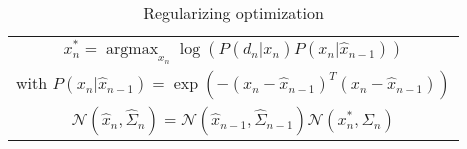 \begin{table}[!h] 
\centering
\caption{Regularizing optimization\label{tab:regularizing}} 
\begin{tabular}{|c|}
\hline

$x_n^* = \operatorname{argmax}_{x_n} \log \left( P(d_n|x_n) P(x_n |\hat{x}_{n - 1})\right)$ \\

with $P(x_n |\hat{x}_{n - 1}) = \exp \left( - (x_n - \hat{x}_{n - 1} )^T (x_n - \hat{x}_{n - 1} )\right)$ \\

$\mathcal{N}(\hat{x}_n, \hat{\Sigma}_n) = \mathcal{N}(\hat{x}_{n - 1}, \hat{\Sigma}_{n - 1}) \mathcal{N}(x_n^*, \Sigma_n)$ \\
	
\hline
\end{tabular}
\end{table}

